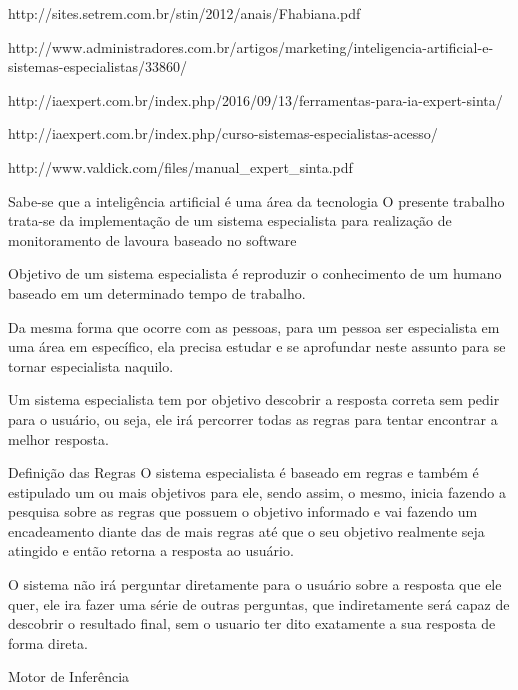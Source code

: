 http://sites.setrem.com.br/stin/2012/anais/Fhabiana.pdf

http://www.administradores.com.br/artigos/marketing/inteligencia-artificial-e-sistemas-especialistas/33860/

http://iaexpert.com.br/index.php/2016/09/13/ferramentas-para-ia-expert-sinta/

http://iaexpert.com.br/index.php/curso-sistemas-especialistas-acesso/

http://www.valdick.com/files/manual_expert_sinta.pdf

Sabe-se que a inteligência artificial é uma área da tecnologia 
O presente trabalho trata-se da implementação de um sistema especialista para realização de monitoramento de lavoura baseado no software %


Objetivo de um sistema especialista é reproduzir o conhecimento de um humano baseado em um determinado tempo de trabalho. 

Da mesma forma que ocorre com as pessoas, para um pessoa ser especialista em uma área em específico, ela precisa estudar e se aprofundar neste assunto para se tornar especialista naquilo. 

Um sistema especialista tem por objetivo descobrir a resposta correta sem pedir para o usuário, ou seja, ele irá percorrer todas as regras para tentar encontrar a melhor resposta.


Definição das Regras
O sistema especialista é baseado em regras e também é estipulado um ou mais objetivos para ele, sendo assim, o mesmo, inicia fazendo a pesquisa sobre as regras que possuem o objetivo informado e vai fazendo um encadeamento diante das de mais regras até que o seu objetivo realmente seja atingido e então retorna a resposta ao usuário.

O sistema não irá perguntar diretamente para o usuário sobre a resposta que ele quer, ele ira fazer uma série de outras perguntas, que indiretamente será capaz de descobrir o resultado final, sem o usuario ter dito exatamente a sua resposta de forma direta.



Motor de Inferência




